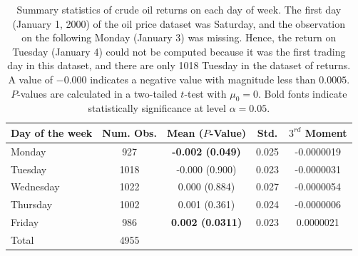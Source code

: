 \documentclass[12pt]{article}
\begin{document}
	\begin{table}[H]
		\small
		\center
		\begin{tabular}{|l|c c c c|}
			\hline
			Day of the week & Num. Obs. & Mean ($P$-Value) & Std. & $3^{rd}$ Moment \\
			\hline
			Monday & 927 & \textbf{-0.002 (0.049)} & 0.025 & -0.0000019 \\
			Tuesday & 1018 & -0.000 (0.900) & 0.023 & -0.0000031 \\
			Wednesday & 1022 & 0.000 (0.884) & 0.027 & -0.0000054 \\
			Thursday & 1002 & 0.001 (0.361) & 0.024 & -0.0000006 \\
			Friday & 986 & \textbf{0.002 (0.0311)} & 0.023 & 0.0000021 \\
			\hline
			Total & 4955 & & & \\
			\hline
		\end{tabular}
		\caption{Summary statistics of crude oil returns on each day of week. The first day (January 1, 2000) of the oil price dataset was Saturday, and the observation on the following Monday (January 3) was missing. Hence, the return on Tuesday (January 4) could not be computed because it was the first trading day in this dataset, and there are only 1018 Tuesday in the dataset of returns. A value of $-0.000$ indicates a negative value with magnitude less than $0.0005$. $P$-values are calculated in a two-tailed $t$-test with $\mu_0 = 0$. Bold fonts indicate statistically significance at level $\alpha=0.05$.}
	\end{table}
	
\end{document}
